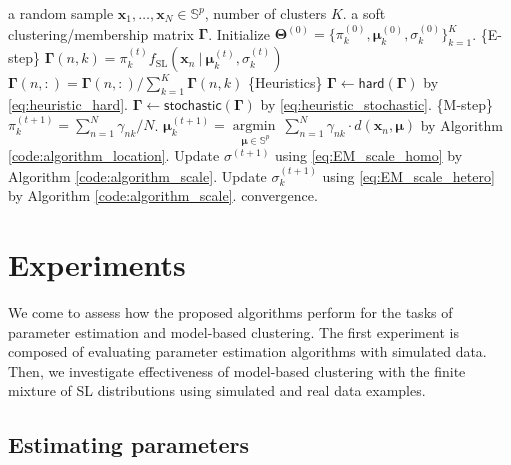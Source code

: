 \documentclass[10pt]{article}
\DeclareMathOperator*{\argmin}{argmin}
\newcommand{\bfx}{\mathbf{x}}
\newcommand{\bfmu}{\boldsymbol{\mu}}
\newcommand{\bfTheta}{\mathbf{\Theta}}
\newcommand{\bfGamma}{\mathbf{\Gamma}}
\newcommand{\bbS}{\mathbb{S}}
\newcommand{\fSL}{f_{\textrm{SL}}}
\begin{document}
\begin{algorithm}[ht]
	\caption{EM algorithm for the mixture of SL distributions.}
	\label{code:em_splaplace}
	\begin{algorithmic}
		\REQUIRE a random sample $\bfx_1, \ldots, \bfx_N \in \bbS^p$, number of clusters $K$.
		\ENSURE a soft clustering/membership matrix $\bfGamma$.		
		\STATE Initialize $ \bfTheta^{(0)} = \lbrace \pi_k^{(0)}, \bfmu_k^{(0)}, \sigma_k^{(0)}\rbrace_{k=1}^K$.
		\REPEAT 
		\STATE \{E-step\}
		\STATE $\bfGamma (n,k)= \pi_k^{(t)} \fSL (\bfx_n~\vert~ \bfmu_k^{(t)}, \sigma_k^{(t)})$
		\ENDFOR
		\STATE $\bfGamma(n,:) = \bfGamma(n,:)/ \sum_{k=1}^K \bfGamma(n,k)$
		\ENDFOR 
		\STATE \{Heuristics\}
		\STATE $\bfGamma \leftarrow \textsf{hard}(\bfGamma)$ by \eqref{eq:heuristic_hard}.
		\STATE $\bfGamma \leftarrow \textsf{stochastic}(\bfGamma)$ by \eqref{eq:heuristic_stochastic}.
		\ENDIF
		\STATE \{M-step\}
		\STATE $\pi_k^{(t+1)} = \sum_{n=1}^N \gamma_{nk} / N$.
		\STATE $\bfmu_k^{(t+1)} = \underset{\bfmu \in \bbS^p}{\argmin~}  \sum_{n=1}^N \gamma_{nk} \cdot d (\bfx_n, \bfmu)$ by Algorithm \ref{code:algorithm_location}. 
		\ENDFOR
		\STATE Update $\sigma^{(t+1)}$ using \eqref{eq:EM_scale_homo} by Algorithm \ref{code:algorithm_scale}.
		\ELSE
		\STATE  Update $\sigma_k^{(t+1)}$ using \eqref{eq:EM_scale_hetero} by Algorithm \ref{code:algorithm_scale}. 
		\ENDFOR
		\ENDIF
		\UNTIL convergence.
	\end{algorithmic}
\end{algorithm}




\section{Experiments}\label{sec6:experiments}

We come to assess how the proposed algorithms perform for the tasks of parameter estimation and model-based clustering. The first experiment is composed of evaluating parameter estimation algorithms with simulated data. Then, we investigate effectiveness of model-based clustering with the finite mixture of SL distributions using simulated and real data examples. 





\subsection{Estimating parameters}
\end{document}
